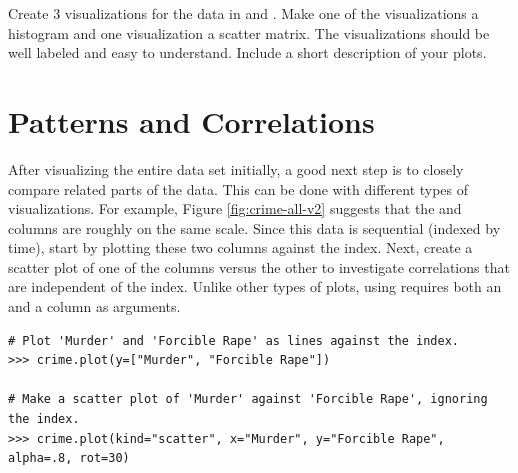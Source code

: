 \begin{problem}
Create 3 visualizations for the data in  and \linebreak {}. 
Make one of the visualizations a histogram and one visualization a scatter matrix.
The visualizations should be well labeled and easy to understand.
Include a short description of your plots.
\end{problem}

\section*{Patterns and Correlations} %

After visualizing the entire data set initially, a good next step is to closely compare related parts of the data.
This can be done with different types of visualizations.
For example, Figure \ref{fig:crime-all-v2} suggests that the  and  columns are roughly on the same scale.
Since this data is sequential (indexed by time), start by plotting these two columns against the index.
Next, create a scatter plot of one of the columns versus the other to investigate correlations that are independent of the index.
Unlike other types of plots, using  requires both an  and a  column as arguments.

\begin{lstlisting}
# Plot 'Murder' and 'Forcible Rape' as lines against the index.
>>> crime.plot(y=["Murder", "Forcible Rape"])

# Make a scatter plot of 'Murder' against 'Forcible Rape', ignoring the index.
>>> crime.plot(kind="scatter", x="Murder", y="Forcible Rape", alpha=.8, rot=30)
\end{lstlisting}

